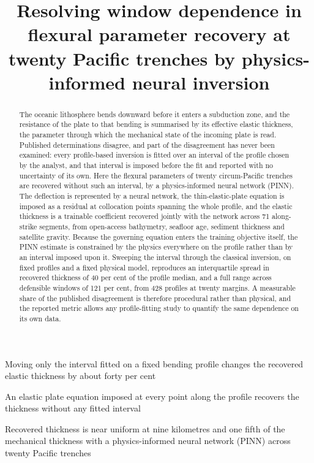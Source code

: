 \documentclass[final]{agujournal2019}
\begin{document}
\title{Resolving window dependence in flexural parameter recovery at twenty
Pacific trenches by physics-informed neural inversion}




\begin{keypoints}
\item Moving only the interval fitted on a fixed bending profile changes the
recovered elastic thickness by about forty per cent
\item An elastic plate equation imposed at every point along the profile
recovers the thickness without any fitted interval
\item Recovered thickness is near uniform at nine kilometres and one fifth of
the mechanical thickness with a physics-informed neural network (PINN) across twenty Pacific trenches
\end{keypoints}

\begin{abstract}
The oceanic lithosphere bends downward before it enters a subduction zone, and
the resistance of the plate to that bending is summarised by its effective
elastic thickness, the parameter through which the mechanical state of the
incoming plate is read. Published determinations disagree, and part of the
disagreement has never been examined: every profile-based inversion is fitted
over an interval of the profile chosen by the analyst, and that interval is
imposed before the fit and reported with no uncertainty of its own. Here the
flexural parameters of twenty circum-Pacific trenches are recovered without such
an interval, by a physics-informed neural network (PINN). The deflection is
represented by a neural network, the thin-elastic-plate equation is imposed as a
residual at collocation points spanning the whole profile, and the elastic
thickness is a trainable coefficient recovered jointly with the network across 71
along-strike segments, from open-access bathymetry, seafloor age, sediment
thickness and satellite gravity. Because the governing equation enters the
training objective itself, the PINN estimate is constrained by the physics
everywhere on the profile rather than by an interval imposed upon it.
Sweeping the interval through the classical inversion, on fixed profiles and a
fixed physical model, reproduces an interquartile spread in recovered thickness
of 40 per cent of the profile median, and a full range across defensible
windows of 121 per cent, from 428 profiles at twenty margins. A measurable
share of the published disagreement is therefore procedural rather than
physical, and the reported metric allows any profile-fitting study to quantify
the same dependence on its own data.
\end{abstract}
\end{document}
